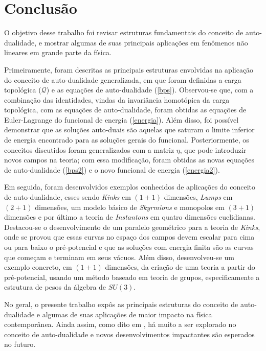 \chapter[Conclusão]{Conclusão}
\label{conclusao}

O objetivo desse trabalho foi revisar estruturas fundamentais do conceito de auto-dualidade, e mostrar algumas de suas principais aplicações em fenômenos não lineares em grande parte da física.

Primeiramente, foram descritas as principais estruturas envolvidas na aplicação do conceito de auto-dualidade generalizada, em que foram definidas a carga topológica ($\mathcal{Q}$) e as equações de auto-dualidade (\ref{bps}). Observou-se que, com a combinação das identidades, vindas da invariância homotópica da carga topológica, com as equações de auto-dualidade, foram obtidas as equações de Euler-Lagrange do funcional de energia (\ref{energia}). Além disso, foi possível demonstrar que as soluções auto-duais são aquelas que saturam o limite inferior de energia encontrado para as soluções gerais do funcional. Posteriormente, os conceitos discutidos foram generalizados com a matriz $\eta$, que pode introduzir novos campos na teoria; com essa modificação, foram obtidas as novas equações de auto-dualidade (\ref{bps2}) e o novo funcional de energia (\ref{energia2}).

Em seguida, foram desenvolvidos exemplos conhecidos de aplicações do conceito de auto-dualidade, esses sendo \textit{Kinks} em $(1+1)$ dimensões, \textit{Lumps} em $(2+1)$ dimensões, um modelo básico de \textit{Skyrmions} e monopolos em $(3+1)$ dimensões e por último a teoria de \textit{Instantons} em quatro dimensões euclidianas. Destacou-se o desenvolvimento de um paralelo geométrico para a teoria de \textit{Kinks}, onde se provou que essas curvas no espaço dos campos devem escalar para cima ou para baixo o pré-potencial e que as soluções com energia finita são as curvas que começam e terminam em seus vácuos. Além disso, desenvolveu-se um exemplo concreto, em $(1+1)$ dimensões, da criação de uma teoria a partir do pré-potencial, usando um método baseado em teoria de grupos, especificamente a estrutura de pesos da álgebra de $SU(3)$.

No geral, o presente trabalho expôs as principais estruturas do conceito de auto-dualidade e algumas de suas aplicações de maior impacto na física contemporânea. Ainda assim, como dito em \cite{laf(1+1)}, há muito a ser explorado no conceito de auto-dualidade e novos desenvolvimentos impactantes são esperados no futuro.